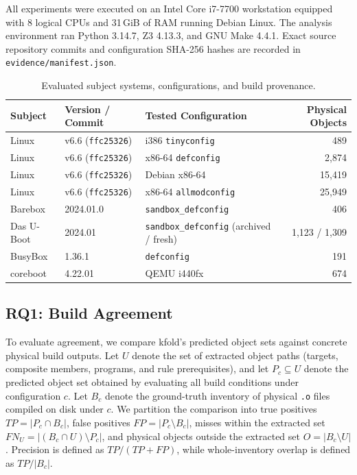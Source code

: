 \documentclass[acmsmall]{acmart}
\newcommand{\tool}{\textsf{kfold}\xspace}
\begin{document}
All experiments were executed on an Intel Core i7-7700 workstation equipped with 8 logical CPUs and 31\,GiB of RAM running Debian Linux.
The analysis environment ran Python 3.14.7, Z3 4.13.3, and GNU Make 4.4.1.
Exact source repository commits and configuration SHA-256 hashes are recorded in \texttt{evidence/manifest.json}.

\begin{table}[t]
\centering\footnotesize
\caption{Evaluated subject systems, configurations, and build provenance.}
\label{tab:subjects}
\begin{tabular}{lllr}
\toprule
Subject & Version / Commit & Tested Configuration & Physical Objects \\
\midrule
Linux & v6.6 (\texttt{ffc25326}) & i386 \texttt{tinyconfig} & 489 \\
Linux & v6.6 (\texttt{ffc25326}) & x86-64 \texttt{defconfig} & 2,874 \\
Linux & v6.6 (\texttt{ffc25326}) & Debian x86-64 & 15,419 \\
Linux & v6.6 (\texttt{ffc25326}) & x86-64 \texttt{allmodconfig} & 25,949 \\
Barebox & 2024.01.0 & \texttt{sandbox\_defconfig} & 406 \\
Das U-Boot & 2024.01 & \texttt{sandbox\_defconfig} (archived / fresh) & 1,123 / 1,309 \\
BusyBox & 1.36.1 & \texttt{defconfig} & 191 \\
coreboot & 4.22.01 & QEMU i440fx & 674 \\
\bottomrule
\end{tabular}
\end{table}

\subsection{RQ1: Build Agreement}\label{sec:eval:agreement}

To evaluate agreement, we compare \tool's predicted object sets against concrete physical build outputs.
Let $U$ denote the set of extracted object paths (targets, composite members, programs, and rule prerequisites), and let $P_c \subseteq U$ denote the predicted object set obtained by evaluating all build conditions under configuration $c$.
Let $B_c$ denote the ground-truth inventory of physical \texttt{.o} files compiled on disk under $c$.
We partition the comparison into true positives $TP = |P_c \cap B_c|$, false positives $FP = |P_c \setminus B_c|$, misses within the extracted set $FN_U = |(B_c \cap U) \setminus P_c|$, and physical objects outside the extracted set $O = |B_c \setminus U|$.
Precision is defined as $TP / (TP + FP)$, while whole-inventory overlap is defined as $TP / |B_c|$.
\end{document}
